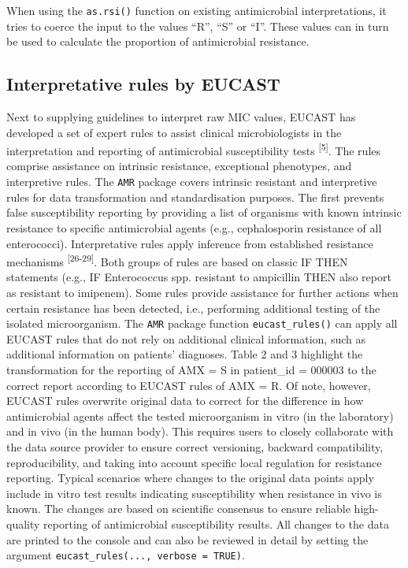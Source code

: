 \documentclass[
]{book}
\begin{document}
When using the \texttt{as.rsi()} function on existing antimicrobial interpretations, it tries to coerce the input to the values ``R'', ``S'' or ``I''. These values can in turn be used to calculate the proportion of antimicrobial resistance.

\hypertarget{interpretative-rules-by-eucast}{%
\subsection{Interpretative rules by EUCAST}\label{interpretative-rules-by-eucast}}

Next to supplying guidelines to interpret raw MIC values, EUCAST has developed a set of expert rules to assist clinical microbiologists in the interpretation and reporting of antimicrobial susceptibility tests \textsuperscript{{[}5{]}}. The rules comprise assistance on intrinsic resistance, exceptional phenotypes, and interpretive rules. The \texttt{AMR} package covers intrinsic resistant and interpretive rules for data transformation and standardisation purposes. The first prevents false susceptibility reporting by providing a list of organisms with known intrinsic resistance to specific antimicrobial agents (e.g., cephalosporin resistance of all enterococci). Interpretative rules apply inference from established resistance mechanisms \textsuperscript{{[}26-29{]}}. Both groups of rules are based on classic IF THEN statements (e.g., IF Enterococcus spp. resistant to ampicillin THEN also report as resistant to imipenem). Some rules provide assistance for further actions when certain resistance has been detected, i.e., performing additional testing of the isolated microorganism. The \texttt{AMR} package function \texttt{eucast\_rules()} can apply all EUCAST rules that do not rely on additional clinical information, such as additional information on patients' diagnoses. Table 2 and 3 highlight the transformation for the reporting of AMX = S in patient\_id = 000003 to the correct report according to EUCAST rules of AMX = R. Of note, however, EUCAST rules overwrite original data to correct for the difference in how antimicrobial agents affect the tested microorganism in vitro (in the laboratory) and in vivo (in the human body). This requires users to closely collaborate with the data source provider to ensure correct versioning, backward compatibility, reproducibility, and taking into account specific local regulation for resistance reporting. Typical scenarios where changes to the original data points apply include in vitro test results indicating susceptibility when resistance in vivo is known. The changes are based on scientific consensus to ensure reliable high-quality reporting of antimicrobial susceptibility results. All changes to the data are printed to the console and can also be reviewed in detail by setting the argument \texttt{eucast\_rules(...,\ verbose\ =\ TRUE)}.
\end{document}
